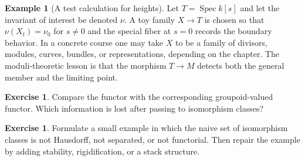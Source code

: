 \documentclass[11pt]{amsart}
\theoremstyle{definition}
\newtheorem{example}[theorem]{Example}
\newtheorem{exercise}[theorem]{Exercise}
\newcommand{\Spec}{\operatorname{Spec}}
\begin{document}
\begin{example}[A test calculation for heights]
Let $T=\Spec k[s]$ and let the invariant of interest be denoted $\nu$.  A toy family $X\to T$ is chosen so that $\nu(X_t)=\nu_0$ for $s\ne0$ and the special fiber at $s=0$ records the boundary behavior.  In a concrete course one may take $X$ to be a family of divisors, modules, curves, bundles, or representations, depending on the chapter.  The moduli-theoretic lesson is that the morphism $T\to M$ detects both the general member and the limiting point.
\end{example}
\begin{exercise}
Compare the functor with the corresponding groupoid-valued functor.  Which information is lost after passing to isomorphism classes?
\end{exercise}
\begin{exercise}
Formulate a small example in which the naive set of isomorphism classes is not Hausdorff, not separated, or not functorial.  Then repair the example by adding stability, rigidification, or a stack structure.
\end{exercise}
\clearpage
\end{document}
